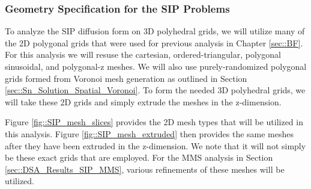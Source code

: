 \subsubsection{Geometry Specification for the SIP Problems}
\label{sec::DSA_Results_SIP_Geometry}

To analyze the SIP diffusion form on 3D polyhedral grids, we will utilize many of the 2D polygonal grids that were used for previous analysis in Chapter \ref{sec::BF}. For this analysis we will resuse the cartesian, ordered-triangular, polygonal sinusoidal, and polygonal-z meshes. We will also use purely-randomized polygonal grids formed from Voronoi mesh generation as outlined in Section \ref{sec::Sn_Solution_Spatial_Voronoi}. To form the needed 3D polyhedral grids, we will take these 2D grids and simply extrude the meshes in the z-dimension. 

Figure \ref{fig::SIP_mesh_slices} provides the 2D mesh types that will be utilized in this analysis. Figure \ref{fig::SIP_mesh_extruded} then provides the same meshes after they have been extruded in the z-dimension. We note that it will not simply be these exact grids that are employed. For the MMS analysis in Section \ref{sec::DSA_Results_SIP_MMS}, various refinements of these meshes will be utilized.


